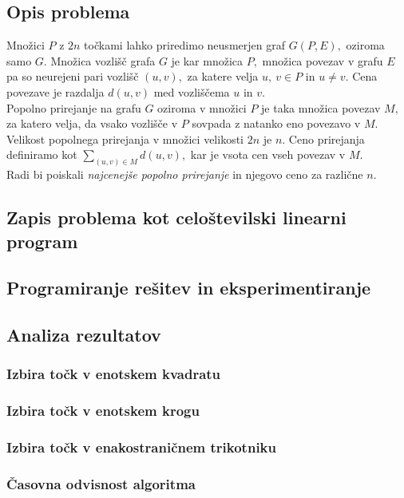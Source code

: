 \documentclass[a4paper, 11pt]{article}
\begin{document}
\subsection{Opis problema}
Množici $P$ z $2n$ točkami lahko priredimo neusmerjen graf $G(P,E),$ oziroma samo $G.$
Množica vozlišč grafa $G$ je kar množica $P,$ množica povezav v grafu $E$ pa so neurejeni pari vozlišč $(u,v),$ za katere velja $u,~v \in P$ in $u \neq v.$ 
Cena povezave je razdalja $d(u,v)$ med vozliščema $u$ in $v.$ \\
Popolno prirejanje na grafu $G$ oziroma v množici $P$ je taka množica povezav $M,$ za katero velja, da vsako vozlišče v $P$ sovpada z natanko eno povezavo v $M$.
Velikost popolnega prirejanja v množici velikosti $2n$ je $n.$ 
Ceno prirejanja definiramo kot $\sum_{(u,v) \in M} d(u,v),$ kar je vsota cen vseh povezav v $M.$ \\
Radi bi poiskali \emph{najcenejše popolno prirejanje} in njegovo ceno za različne $n.$

\subsection{Zapis problema kot celoštevilski linearni program}

\subsection{Programiranje rešitev in eksperimentiranje}

\subsection{Analiza rezultatov}
\subsubsection*{Izbira točk v enotskem kvadratu}

\subsubsection*{Izbira točk v enotskem krogu}

\subsubsection*{Izbira točk v enakostraničnem trikotniku}

\subsubsection*{Časovna odvisnost algoritma}
\end{document}
